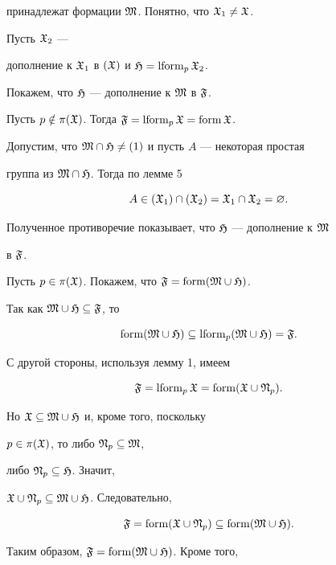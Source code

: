 \begin{pf}
принадлежат формации $\frak M$. Понятно, что $\frak X_1\ne\frak X$. 


Пусть $\frak X_2$ --- 


дополнение к $\frak X_1$ в $(\frak X)$ и $\frak H=\operatorname{lform}_p\frak X_2$. 


 


Покажем, что $\frak H$ --- дополнение к $\frak M$ в $\frak F$. 


Пусть $p\notin\pi(\frak X)$. Тогда $\frak F=\operatorname{lform}_p\frak X=\operatorname{form}\frak X$. 


Допустим, что $\frak M\cap\frak H\ne(1)$ и пусть $A$ --- некоторая простая 


группа из $\frak M\cap\frak H$. Тогда по лемме 5 


$$ 


A\in(\frak X_1)\cap(\frak X_2)=\frak X_1\cap\frak X_2=\varnothing. 


$$ 


Полученное противоречие показывает, что $\frak H$ --- дополнение к $\frak M$ 


в $\frak F$. 


 


Пусть $p\in\pi(\frak X)$. Покажем, что $\frak F=\operatorname{form}(\frak M\cup\frak H)$. 


Так как $\frak M\cup\frak H\subseteq\frak F$, то 


$$ 


\form(\frak M\cup\frak H)\subseteq\lform_p(\frak M\cup\frak H)=\frak F. 


$$ 


С другой стороны, используя лемму 1, имеем 


$$ 


\frak F=\lform_p\frak X=\form(\frak X\cup\frak N_p). 


$$ 


Но $\frak X\subseteq\frak M\cup\frak H$ и, кроме того, поскольку 


$p\in\pi(\frak X)$, то либо $\frak N_p\subseteq\frak M$, 


либо $\frak N_p\subseteq\frak H$. Значит, 


$\frak X\cup\frak N_p\subseteq\frak M\cup\frak H$. Следовательно, 


$$ 


\frak F=\form(\frak X\cup\frak N_p)\subseteq\form(\frak M\cup\frak H). 


$$ 


Таким образом, $\frak F=\operatorname{form}(\frak M\cup\frak H)$. Кроме того, 



\end{pf}
